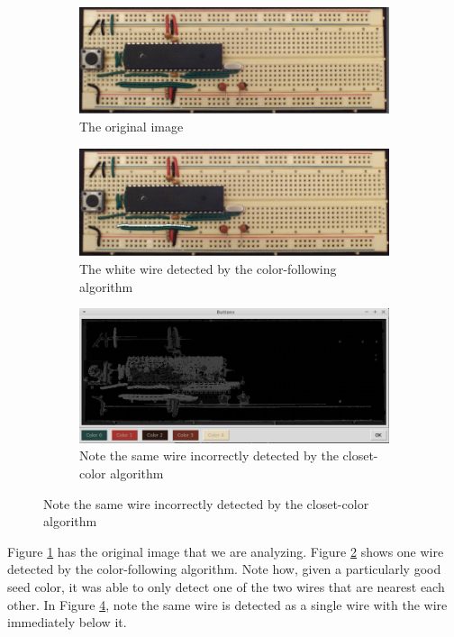 \documentclass[10pt,twocolumn,letterpaper]{article}
\begin{document}
\begin{figure}[ht]
\centering
\begin{subfigure}[b]{\linewidth}
	\centering
   \includegraphics[width=0.9\linewidth]{demos/original_of_comp.png}
	\caption{The original image}
	\label{fig:origcomp}
\end{subfigure}
\begin{subfigure}[b]{\linewidth}
	\centering
   \includegraphics[width=0.9\linewidth]{demos/single_wire_not_double.png}
	\caption{The white wire detected by the color-following algorithm}
	\label{fig:cfollow}
\end{subfigure}
\begin{subfigure}[b]{\linewidth}
	\centering
   \includegraphics[width=0.9\linewidth]{demos/closest_color.png}
   \caption{Note the same wire incorrectly detected by the closet-color algorithm}
	\label{fig:ncolor}
\end{subfigure}
\end{figure}

Figure \ref{fig:origcomp} has the original image that we are analyzing. Figure
\ref{fig:cfollow} shows one wire detected by the color-following algorithm.
Note how, given a particularly good seed color, it was able to only detect one
of the two wires that are nearest each other. In Figure \ref{fig:ncolor}, note
the same wire is detected as a single wire with the wire immediately below it. 
\end{document}
